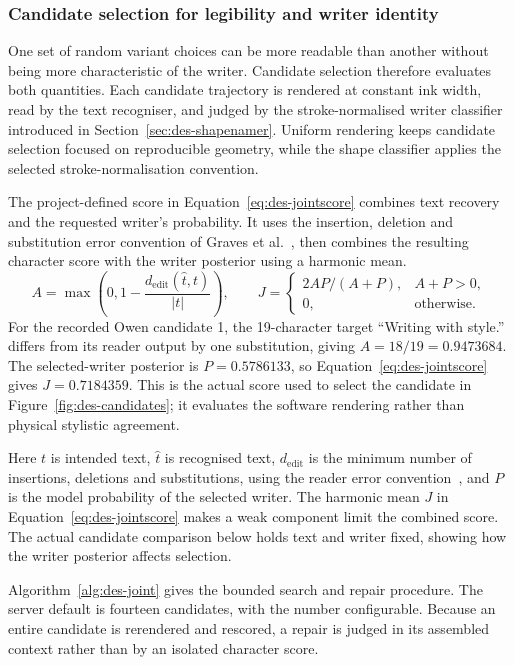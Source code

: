 \subsubsection{Candidate selection for legibility and writer identity}
\label{sec:des-selection}
One set of random variant choices can be more readable than another without being more characteristic of the writer. Candidate selection therefore evaluates both quantities. Each candidate trajectory is rendered at constant ink width, read by the text recogniser, and judged by the stroke-normalised writer classifier introduced in Section~\ref{sec:des-shapenamer}. Uniform rendering keeps candidate selection focused on reproducible geometry, while the shape classifier applies the selected stroke-normalisation convention.


The project-defined score in Equation~\ref{eq:des-jointscore} combines text recovery and the requested writer's probability. It uses the insertion, deletion and substitution error convention of Graves et al.~\cite[PDF p.~2, Sec.~2.1]{graves2006}, then combines the resulting character score with the writer posterior using a harmonic mean.
\begin{equation}
A=\max\left(0,1-\frac{d_{\mathrm{edit}}(\widehat t,t)}{|t|}\right),\qquad
J=\begin{cases}2AP/(A+P),&A+P>0,\\0,&\text{otherwise}.\end{cases}
\label{eq:des-jointscore}
\end{equation}
For the recorded Owen candidate 1, the 19-character target ``Writing with style.'' differs from its reader output by one substitution, giving $A=18/19=0.9473684$. The selected-writer posterior is $P=0.5786133$, so Equation~\ref{eq:des-jointscore} gives $J=0.7184359$. This is the actual score used to select the candidate in Figure~\ref{fig:des-candidates}; it evaluates the software rendering rather than physical stylistic agreement.

Here $t$ is intended text, $\widehat t$ is recognised text, $d_{\mathrm{edit}}$ is the minimum number of insertions, deletions and substitutions, using the reader error convention~\cite[PDF p.~2, Sec.~2.1]{graves2006}, and $P$ is the model probability of the selected writer. The harmonic mean $J$ in Equation~\ref{eq:des-jointscore} makes a weak component limit the combined score. The actual candidate comparison below holds text and writer fixed, showing how the writer posterior affects selection.

Algorithm~\ref{alg:des-joint} gives the bounded search and repair procedure. The server default is fourteen candidates, with the number configurable. Because an entire candidate is rerendered and rescored, a repair is judged in its assembled context rather than by an isolated character score.


